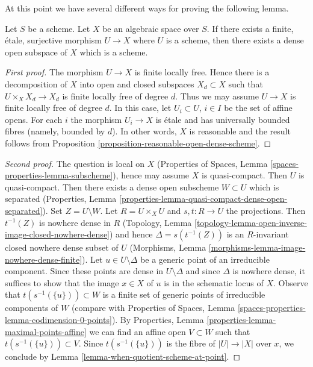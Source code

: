 \noindent
At this point we have several different ways for proving the following
lemma.

\begin{lemma}
\label{lemma-finite-etale-cover-dense-open-scheme}
Let $S$ be a scheme. Let $X$ be an algebraic space over $S$.
If there exists a finite, \'etale, surjective morphism
$U \to X$ where $U$ is a scheme, then there exists a dense open subspace
of $X$ which is a scheme.
\end{lemma}

\begin{proof}[First proof]
The morphism $U \to X$ is finite locally free. Hence there is a decomposition
of $X$ into open and closed subspaces $X_d \subset X$ such that
$U \times_X X_d \to X_d$ is finite locally free of degree $d$.
Thus we may assume $U \to X$ is finite locally free of degree $d$.
In this case, let $U_i \subset U$, $i \in I$ be the set of affine opens.
For each $i$ the morphism $U_i \to X$ is \'etale and has
universally bounded fibres (namely, bounded by $d$).
In other words, $X$ is reasonable and
the result follows from
Proposition \ref{proposition-reasonable-open-dense-scheme}.
\end{proof}

\begin{proof}[Second proof]
The question is local on $X$
(Properties of Spaces, Lemma \ref{spaces-properties-lemma-subscheme}),
hence may assume $X$ is quasi-compact. Then $U$ is quasi-compact.
Then there exists a dense open subscheme $W \subset U$ which is
separated (Properties, Lemma
\ref{properties-lemma-quasi-compact-dense-open-separated}).
Set $Z = U \setminus W$.
Let $R = U \times_X U$ and $s, t : R \to U$ the projections.
Then $t^{-1}(Z)$ is nowhere dense in $R$
(Topology, Lemma \ref{topology-lemma-open-inverse-image-closed-nowhere-dense})
and hence $\Delta = s(t^{-1}(Z))$ is an $R$-invariant
closed nowhere dense subset of $U$
(Morphisms, Lemma \ref{morphisms-lemma-image-nowhere-dense-finite}).
Let $u \in U \setminus \Delta$ be a generic point of an
irreducible component. Since these points are dense in $U \setminus \Delta$
and since $\Delta$ is nowhere dense, it suffices to show that the image
$x \in X$ of $u$ is in the schematic locus of $X$.
Observe that $t(s^{-1}(\{u\})) \subset W$ is a
finite set of generic points of irreducible components of $W$
(compare with
Properties of Spaces, Lemma
\ref{spaces-properties-lemma-codimension-0-points}).
By Properties, Lemma \ref{properties-lemma-maximal-points-affine}
we can find an affine open $V \subset W$ such that
$t(s^{-1}(\{u\})) \subset V$. Since $t(s^{-1}(\{u\}))$ is the fibre
of $|U| \to |X|$ over $x$, we conclude by
Lemma \ref{lemma-when-quotient-scheme-at-point}.
\end{proof}

